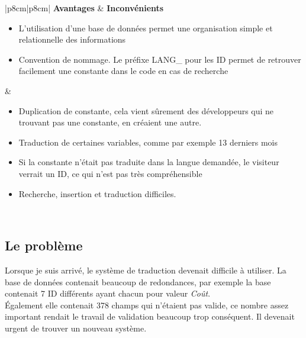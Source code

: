 \begin{table}[H] %
	\centering
	\begin{tabular}{|p{8cm}|p{8cm}|}
		\hline
		\textbf{Avantages} & \textbf{Inconvénients}\\
		\hline
        \begin{minipage}{\linewidth}
        \vspace{10px}
            \begin{itemize}
                \item L'utilisation d'une base de données permet une organisation simple et relationnelle des informations\\
                \item Convention de nommage. Le préfixe LANG\_ pour les ID permet de retrouver facilement une constante dans le code en cas de recherche
            \end{itemize}
        \vspace{10px}
        \end{minipage}
        &
        \begin{minipage}{\linewidth}
        \vspace{10px}
            \begin{itemize}
                \item Duplication de constante, cela vient sûrement des développeurs qui ne trouvant pas une constante, en créaient une autre.
                \item Traduction de certaines variables, comme par exemple 13 derniers mois
                \item Si la constante n'était pas traduite dans la langue demandée, le visiteur verrait un ID, ce qui n'est pas très compréhensible
                \item Recherche, insertion et traduction difficiles.
            \end{itemize}
        \vspace{10px}
        \end{minipage}\\
        \hline
	\end{tabular}
	\caption{Avantages et inconvenients du système}
	\label{table:inconveignantsEtAvantages}
\end{table}

\subsection{Le problème}
Lorsque je suis arrivé, le système de traduction devenait difficile à utiliser. La base de données contenait beaucoup de redondances, par exemple la base contenait 7 ID différents ayant chacun pour valeur \textit{Coût}.\\
\'Egalement elle contenait 378 champs qui n'étaient pas valide, ce nombre assez important rendait le travail de validation beaucoup trop conséquent. Il devenait urgent de trouver un nouveau système.


